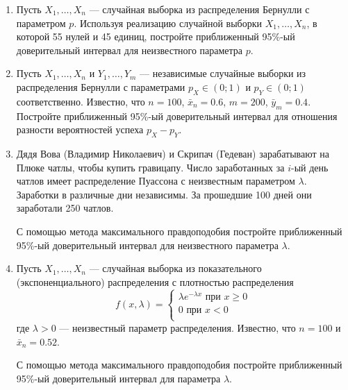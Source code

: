 \begin{enumerate}
\item Пусть $X_{1}, \ldots, X_{n}$ — случайная выборка из распределения Бернулли
с параметром $p$.
Используя реализацию случайной выборки $X_{1}, \ldots, X_{n}$,
в которой 55 нулей и 45 единиц,
постройте приближенный 95\%-ый доверительный интервал для неизвестного параметра $p$.

\item Пусть $X_{1}, \ldots, X_{n}$ и $Y_{1}, \ldots, Y_{m}$ — независимые случайные
выборки из распределения Бернулли с параметрами $p_{X} \in (0;1)$ и $p_{Y} \in (0;1)$ соответственно.
Известно, что $n = 100$, $\bar{x}_{n} = 0.6$, $m = 200$, $\bar{y}_{m} = 0.4$.
Постройте приближенный 95\%-ый доверительный интервал для отношения разности
вероятностей успеха $p_{X} - p_{Y}$.

\item Дядя Вова (Владимир Николаевич) и Скрипач (Гедеван) зарабатывают на Плюке чатлы,
чтобы купить гравицапу.
Число заработанных за $i$-ый день чатлов имеет распределение Пуассона с неизвестным параметром $\lambda$.
Заработки в различные дни независимы. За прошедшие 100 дней они заработали 250 чатлов.

С помощью метода максимального правдоподобия постройте приближенный
95\%-ый доверительный интервал для неизвестного параметра $\lambda$.

\item Пусть $X_{1}, \ldots, X_{n}$ — случайная выборка из показательного
(экспоненциального) распределения с плотностью распределения
\[
f(x,\lambda)=
\begin{cases}
\lambda e^{-\lambda x}\text{ при } x\geq 0 \\
0 \text{ при } x < 0 \\
\end{cases}
\]
где $\lambda > 0$ — неизвестный параметр распределения.
Известно, что $n = 100$ и $\bar{x}_n = 0.52$.

С помощью метода максимального правдоподобия постройте приближенный
95\%-ый доверительный интервал для параметра $\lambda$.





\end{enumerate}
